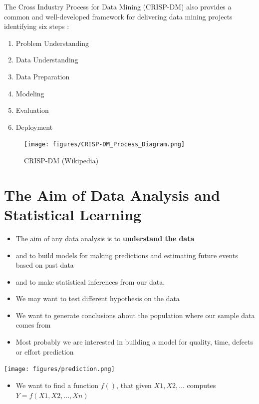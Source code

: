 \documentclass[
]{book}
\providecommand{\tightlist}{%
  \setlength{\itemsep}{0pt}\setlength{\parskip}{0pt}}
\begin{document}
The Cross Industry Process for Data Mining (CRISP-DM) also provides a common and well-developed framework for delivering data mining projects identifying six steps \citep{shearer00crisp}:

\begin{enumerate}
\def\labelenumi{\arabic{enumi}.}
\tightlist
\item
  Problem Understanding
\item
  Data Understanding
\item
  Data Preparation
\item
  Modeling
\item
  Evaluation
\item
  Deployment
\end{enumerate}

\begin{figure}
\centering
\texttt{[image: figures/CRISP-DM\_Process\_Diagram.png]}
\caption{CRISP-DM (Wikipedia)}
\end{figure}

\hypertarget{the-aim-of-data-analysis-and-statistical-learning}{%
\section{The Aim of Data Analysis and Statistical Learning}\label{the-aim-of-data-analysis-and-statistical-learning}}

\begin{itemize}
\tightlist
\item
  The aim of any data analysis is to \textbf{understand the data}
\item
  and to build models for making predictions and estimating future events based on past data
\item
  and to make statistical inferences from our data.
\item
  We may want to test different hypothesis on the data
\item
  We want to generate conclusions about the population where our sample data comes from
\item
  Most probably we are interested in building a model for quality, time, defects or effort prediction
\end{itemize}

\texttt{[image: figures/prediction.png]}

\begin{itemize}
\tightlist
\item
  We want to find a function \(f()\), that given \(X1, X2, ...\) computes \(Y=f(X1, X2, ..., Xn)\)
\end{itemize}
\end{document}
